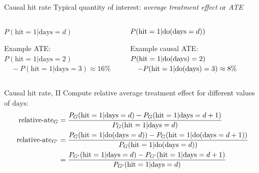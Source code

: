 \begin{frame}{Causal hit rate}
    Typical quantity of interest: \emph{average treatment effect} or \emph{ATE}
    \begin{columns}[T] %
        \begin{column}{.48\textwidth}
            $P(\textrm{hit}=1 | \textrm{days}=d)$\newline

            \newline\newline

            Example ATE: \newline
            $P(\textrm{hit}=1 | \textrm{days} = 2) $\newline
            $\quad - P(\textrm{hit}=1 | \textrm{days} = 3) \approx  16\%$
        \end{column}%
        \begin{column}{.48\textwidth}
            $P(\textrm{hit}=1 | \mathrm{do}(\textrm{days}=d))$\newline

            \newline \newline
            Example causal ATE: \newline
            $P(\textrm{hit}=1 |\mathrm{do}(\textrm{days} )= 2)$\newline
            $\quad - P(\textrm{hit}=1 | \mathrm{do}(\textrm{days}) = 3) \approx 8\%$
        \end{column}%
    \end{columns}
\end{frame}

\begin{frame}{Causal hit rate, II}
    Compute relative average treatment effect for different values of $\textrm{days}$:
    \begin{align*}
        \textrm{relative-ate}_G &= \frac{
            P_G(\textrm{hit}=1 | \textrm{days}=d) - P_G(\textrm{hit}=1 | \textrm{days}=d+1)
        }{P_G(\textrm{hit}=1 | \textrm{days}=d)} \\
        \textrm{relative-ate}_{G'} &= \frac{
            P_G(\textrm{hit}=1 | \mathrm{do}(\textrm{days}=d)) - P_G(\textrm{hit}=1 | \mathrm{do}(\textrm{days}=d+1))
        }{P_G(\textrm{hit}=1 | \mathrm{do}(\textrm{days}=d))} \\
        & = \frac{
            P_{G'}(\textrm{hit}=1 | \textrm{days}=d) - P_{G'}(\textrm{hit}=1 | \textrm{days}=d+1)
        }{P_{G'}(\textrm{hit}=1 | \textrm{days}=d)}
    \end{align*}
    \begin{center}
        
    \end{center}
\end{frame}

